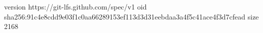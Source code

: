 version https://git-lfs.github.com/spec/v1
oid sha256:91c4e8cdd9e03f1c0aa66289153ef113d3d31eebdaa3a4f5c41ace4f3d7cfead
size 2168

